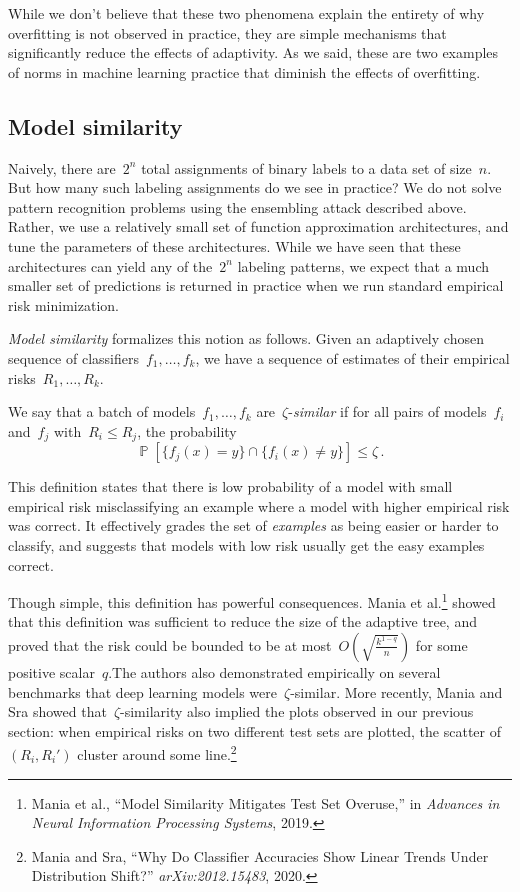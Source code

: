 \documentclass{tufte-book}
\begin{document}
While we don't believe that these two phenomena explain the entirety of
why overfitting is not observed in practice, they are simple mechanisms
that significantly reduce the effects of adaptivity. As we said, these
are two examples of norms in machine learning practice that diminish the
effects of overfitting.

\hypertarget{model-similarity}{%
\subsection{Model similarity}\label{model-similarity}}

Naively, there are~\(2^n\) total assignments of binary labels to a data
set of size~\(n\). But how many such labeling assignments do we see in
practice? We do not solve pattern recognition problems using the
ensembling attack described above. Rather, we use a relatively small set
of function approximation architectures, and tune the parameters of
these architectures. While we have seen that these architectures can
yield any of the~\(2^n\) labeling patterns, we expect that a much
smaller set of predictions is returned in practice when we run standard
empirical risk minimization.

\emph{Model similarity} formalizes this notion as follows. Given an
adaptively chosen sequence of classifiers~\(f_1,\dots,f_k\), we have a
sequence of estimates of their empirical risks~\(R_1,\dots,R_k\).

\begin{Definition}

We say that a batch of models~\(f_1,\ldots,f_k\)
are~\(\zeta\)-\emph{similar} if for all pairs of models~\(f_i\)
and~\(f_j\) with~\(R_i \leq R_j\), the probability \[
  \mathop\mathbb{P}\left[\{f_j(x) = y\} \cap \{f_i(x) \neq y\} \right] \leq \zeta\,.
\]

\end{Definition}

This definition states that there is low probability of a model with
small empirical risk misclassifying an example where a model with higher
empirical risk was correct. It effectively grades the set of
\emph{examples} as being easier or harder to classify, and suggests that
models with low risk usually get the easy examples correct.

Though simple, this definition has powerful consequences. Mania et
al.\footnote{Mania et al., {``Model Similarity Mitigates Test Set
  Overuse,''} in \emph{Advances in Neural Information Processing
  Systems}, 2019.} showed that this definition was sufficient to reduce
the size of the adaptive tree, and proved that the risk could be bounded
to be at most~\(O(\sqrt{\frac{k^{1-q}}{n}})\) for some positive
scalar~\(q\).The authors also demonstrated empirically on several
benchmarks that deep learning models were~\(\zeta\)-similar. More
recently, Mania and Sra showed that~\(\zeta\)-similarity also implied
the plots observed in our previous section: when empirical risks on two
different test sets are plotted, the scatter of~\((R_i,R_i')\) cluster
around some line.\footnote{Mania and Sra, {``Why Do Classifier
  Accuracies Show Linear Trends Under Distribution Shift?''}
  \emph{arXiv:2012.15483}, 2020.}
\end{document}

